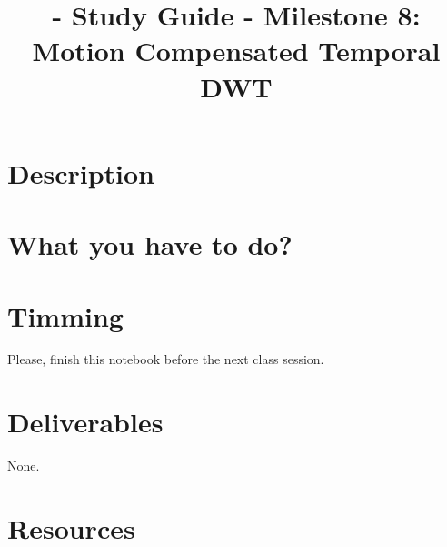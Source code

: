 
\title{\SM{} - Study Guide - Milestone 8: Motion Compensated Temporal DWT}

\maketitle

\section{Description}


\section{What you have to do?}
  

\section{Timming}

Please, finish this notebook before the next class session.

\section{Deliverables}

None.

\section{Resources}



